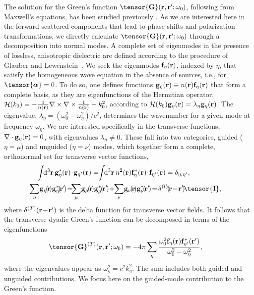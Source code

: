 \documentclass[aps,pra,twocolumn]{revtex4-1} %
\newcommand{\unittens}{\tensor{\mathbf{I}}}
\newcommand{\eigenf}{\mbf{f}_\eta}
\newcommand{\eigenfp}{\mbf{f}_{\eta'}}
\newcommand{\eigeng}{\mbf{g}_\eta}
\newcommand{\eigengp}{\mbf{g}_{\eta'}}
\begin{document}
The solution for the Green's function $\tensor{\mathbf{G}}(\br ,\br' ; \omega_0)$, following from Maxwell's equations,  
has been studied previously \cite{sakoda_optical_1996,sondergaard_general_2001,wubs_multiple-scattering_2004}.  As we are interested here in the forward-scattered components that lead to phase shifts and polarization transformations, we directly calculate $\tensor{\mathbf{G}}(\br ,\br' ; \omega_0)$ through a decomposition into normal modes.  A complete set of eigenmodes in the presence of lossless, anisotropic dielectric are defined according to the procedure of Glauber and Lewenstein~\cite{glauber_quantum_1991}.  We seek the eigenmodes $\eigenf(\mathbf{r})$, indexed by $\eta$, that satisfy the homogeneous wave equation in the absence of sources, i.e.,  for $\tensor{\boldsymbol{\alpha}} = 0$.  To do so, one defines functions $\eigeng(\mbf{r}) \equiv n(\br) \eigenf(\mbf{r})$ that form a complete basis, as they are eigenfunctions of the Hermitian operator, $\mathcal{H}(k_0) = -\frac{1}{n(\mathbf{r})} \nabla\times\nabla\times \frac{1}{n(\mathbf{r})} + k_0^2$, according to $\mathcal{H}(k_0)  \eigeng(\mbf{r}) = \lambda_\eta \eigeng(\mbf{r})$. The eigenvalue, $\lambda_\eta= (\omega_0^2-\omega_\eta^2)/c^2$, determines the wavenumber for a given mode at frequency $\omega_\eta$.  We are interested specifically in the transverse functions, $\nabla\cdot \eigeng(\br) = 0$, with eigenvalues $\lambda_n \neq 0$.  These fall into two categories, guided ($\eta = \mu$) and unguided ($\eta = \nu$) modes, which together form a complete, orthonormal set for transverse vector functions,
	\begin{align}
	&\int\!\! \mathrm{d}^3\br \, \eigeng^*(\mbf{r}) \!\cdot\! \eigengp(\mbf{r})  =\!\! \int\!\! \mathrm{d}^3\br \, n^2(\br) \eigenf^* (\br)\!\cdot\!  \eigenfp(\br) =\delta_{\eta, \eta'},\label{Eq::Orthogonality}\\
	&\!\!\!\!\!\!\!\sum_\eta \!\mathbf{g}_\eta\!(\!\br\!) \mathbf{g}_\eta^*\!(\!\br'\!) \!=\!\!\!  \sum_\mu\! \mathbf{g}_\mu\!(\!\br\!) \mathbf{g}_\mu^*\!(\!\br'\!)  \!+\!\! \sum_\nu\! \mathbf{g}_\nu\!(\!\br\!) \mathbf{g}_\nu^*\!(\!\br'\!)  \!=\!\delta^{(\!T\!)}\!(\!\br\!-\!\br'\!)\!  \unittens, \label{Eq::Completeness}
	\end{align}
where $\delta^{(T)}(\mathbf{r}\!-\!\mathbf{r}')$ is the delta function for transverse vector fields.  It follows that the transverse dyadic Green's function can be decomposed in terms of the eigenfunctions~\cite{sakoda_optical_1996, sondergaard_general_2001}
	\begin{align}
		\tensor{\mathbf{G}}^{(T)}(\br,\br'; \omega_0) &= -4\pi \sum_{\eta} \frac{  \omega_0^2 \eigenf (\br) 
\eigenfp^* (\br')}{\omega_0^2-\omega_\eta^2},
	\end{align}
where the eigenvalues appear as $\omega_\eta^2 = c^2 k_\eta^2$.  The sum includes both guided and unguided contributions. We focus here on the guided-mode contribution to the Green's function. 
\end{document}
